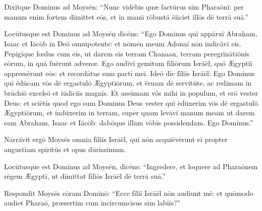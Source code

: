 \chapter{}
\thispagestyle{empty}
Dīxitque Dominus ad Moysēn: ``Nunc vidēbis quæ factūrus
sim Pharaōnī: per manum enim fortem dīmittet eōs, et in
manū rōbustā ēiiciet illōs dē
terrā suā.''

Locūtusque est
Dominus ad Moysēn dīcēns: ``Ego Dominus quī appāruī
Abraham, Isaac et Iācōb in Deō omnipotente:
et nōmen meum Adonaī
nōn indicāvī eīs. 
Pepigīque fœdus cum eīs, ut darem eīs terram
Chanaan, terram peregrīnātiōnis eōrum, in
quā fuērunt advenæ.  Ego audīvī gemitum fīliōrum Isrāēl, quō Ægyptiī
oppressērunt eōs:
et recordātus sum pactī meī.  Ideō dīc
fīliīs Isrāēl: Ego Dominus quī ēdūcam vōs dē
ergastulō Ægyptiōrum, et ēruam dē servitūte, ac redimam in
brāchiō excelsō et
iūdiciīs
magnīs.  Et assūmam vōs mihi in populum, et erō vester Deus: et sciētis
quod ego sum Dominus Deus vester quī ēdūxerim vōs dē
ergastulō Ægyptiōrum,  et indūxerim in terram, super quam
levāvī manum meam ut darem eam Abraham, Isaac et Iācōb:
dabōque illam vōbīs possidendam. Ego Dominus.''

Nārrāvit ergō
Moysēs omnia fīliīs Isrāēl, quī nōn
acquiēvērunt eī propter angustiam
spīritūs et opus dūrissimum.  

Locūtusque est Dominus ad
Moysēn, dīcēns:  ``Ingredere, et
loquere ad Pharaōnem rēgem Ægyptī, ut dīmittat fīliōs
Isrāēl dē terrā suā.''

Respondit Moysēs
cōram Dominō: ``Ecce fīliī Isrāēl nōn audiunt mē: et
quōmodo audiet Pharaō, præsertim cum
incircumcīsus sim labiīs?''

